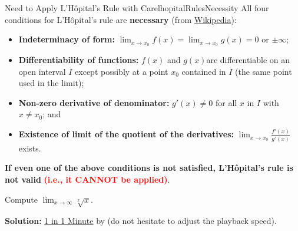  \begin{factColor}{Need to Apply  L'H\^opital's Rule with Care}{lhopitalRulesNecessity}
         All four conditions for L'H\^opital's rule are \textbf{necessary} (from \href{https://en.wikipedia.org/wiki/L%27H%C3%B4pital%27s_rule#:~:text=Cases%20where%20theorem%20cannot%20be%20applied%20(Necessity%20of%20conditions)}{Wikipedia}):
\begin{itemize}

\item \textbf{Indeterminacy of form:} $\displaystyle \lim_{x \to x_0} f(x) = \lim_{x \to x_0} g(x) = 0 $ or $\pm \infty $; 
\item \textbf{Differentiability of functions:} $f(x)$ and $g(x) $are differentiable on an open interval $I$ except possibly at a point $x_0$ contained in $I$ (the same point used in the limit); 
\item \textbf{Non-zero derivative of denominator:} $g'(x) \ne 0 $ for all $x $ in $I$ with $x \ne x_0 $; and
\item \textbf{Existence of limit of the quotient of the derivatives:} $\displaystyle \lim_{x \to x_0} \frac{f'(x)}{g'(x)}$ exists.
\end{itemize}
{\bf If even one of the above conditions is not satisfied, L'H\^opital's rule is not valid} \textcolor{red}{\bf (i.e., it CANNOT be applied)}.
 \end{factColor}
 

\vspace*{.2cm}

\begin{example} Compute $\displaystyle \lim_{x \to \infty} \sqrt[x]{x}$.
    
\end{example}
\textbf{Solution:} \href{https://www.youtube.com/shorts/2V9BkfIoqv8?feature=share}{1 in 1 Minute} by \bprp (do not hesitate to adjust the playback speed).
\Qed

\begin{center}
\setlength{\fboxrule}{2pt}  %
\end{center}




